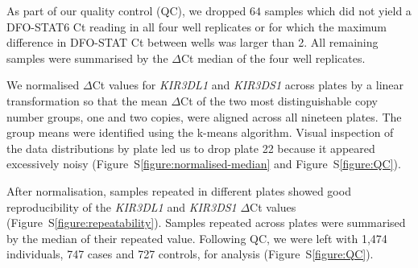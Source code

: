 As part of our quality control (QC), we dropped $64$ samples which did not yield a DFO-STAT6 Ct reading in all four well replicates
or for which the maximum difference in DFO-STAT Ct between wells was larger than 2.
All remaining samples were summarised by the $\Delta$Ct median of the four well replicates.




We normalised $\Delta$Ct values for \emph{KIR3DL1} and \emph{KIR3DS1} across plates by a linear transformation so that
the mean $\Delta$Ct of the two most distinguishable copy number groups, one and two copies, were aligned across all nineteen plates.
The group means were identified using the k-means algorithm.
Visual inspection of the data distributions by plate led us to drop plate 22 because it appeared excessively noisy (Figure~S\ref{figure:normalised-median} and Figure~S\ref{figure:QC}).


After normalisation, samples repeated in different plates showed good reproducibility of the \emph{KIR3DL1} and \emph{KIR3DS1} $\Delta$Ct values (Figure~S\ref{figure:repeatability}).
Samples repeated across plates were summarised by the median of their repeated value.
Following QC, we were left with 1,474 individuals, 747 cases and 727 controls, for analysis (Figure~S\ref{figure:QC}).


